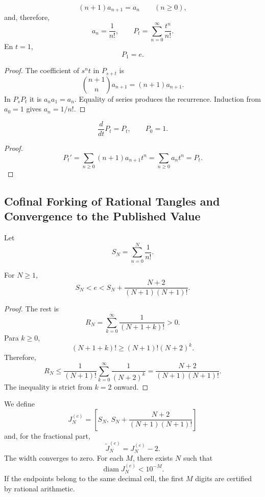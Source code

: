 \begin{theorem}
\label{p12-83-c9-s2:thm:recurrencia-factorial-e}
\[
 (n+1)a_{n+1}=a_n
 \qquad(n\geq0),
\]
and, therefore,
\[
 a_n=\frac1{n!},
 \qquad
 P_t=\sum_{n=0}^{\infty}\frac{t^n}{n!}.
\]
En \(t=1\),
\[
 \boxed{P_1=e.}
\]
\end{theorem}

\begin{proof}
The coefficient of \(s^nt\) in \(P_{s+t}\) is
\[
 \binom{n+1}{n}a_{n+1}=(n+1)a_{n+1}.
\]
In \(P_sP_t\) it is \(a_na_1=a_n\). Equality of series produces the
recurrence. Induction from \(a_0=1\) gives \(a_n=1/n!\).
\end{proof}

\begin{corollary}
\[
 \frac{d}{dt}P_t=P_t,
 \qquad P_0=1.
\]
\end{corollary}

\begin{proof}
\[
 P_t'=\sum_{n\geq0}(n+1)a_{n+1}t^n
 =\sum_{n\geq0}a_nt^n=P_t.
\]
\end{proof}

\subsection{Cofinal Forking of Rational Tangles and Convergence to the Published Value}

Let
\[
 S_N=\sum_{n=0}^{N}\frac1{n!}.
\]

\begin{theorem}
\label{p12-83-c9-s2:thm:cota-factorial-e}
For \(N\geq1\),
\begin{equation}
 \boxed{
 S_N<e<
 S_N+\frac{N+2}{(N+1)(N+1)!}.}
 \label{p12-83-c9-s2:eq:horquilla-factorial-e}
\end{equation}
\end{theorem}

\begin{proof}
The rest is
\[
 R_N=\sum_{k=0}^{\infty}\frac1{(N+1+k)!}>0.
\]
Para \(k\geq0\),
\[
 (N+1+k)!
 \geq(N+1)!(N+2)^k.
\]
Therefore,
\[
 R_N
 \leq\frac1{(N+1)!}
 \sum_{k=0}^{\infty}\frac1{(N+2)^k}
 =\frac{N+2}{(N+1)(N+1)!}.
\]
The inequality is strict from \(k=2\) onward.
\end{proof}

We define
\[
 J_N^{(e)}=
 \left[
 S_N,\,
 S_N+\frac{N+2}{(N+1)(N+1)!}
 \right]
\]
and, for the fractional part,
\[
 \widetilde J_N^{(e)}=J_N^{(e)}-2.
\]
The width converges to zero. For each \(M\), there exists \(N\) such that
\[
 \operatorname{diam}J_N^{(e)}<10^{-M}.
\]
If the endpoints belong to the same decimal cell, the first \(M\)
digits are certified by rational arithmetic.

